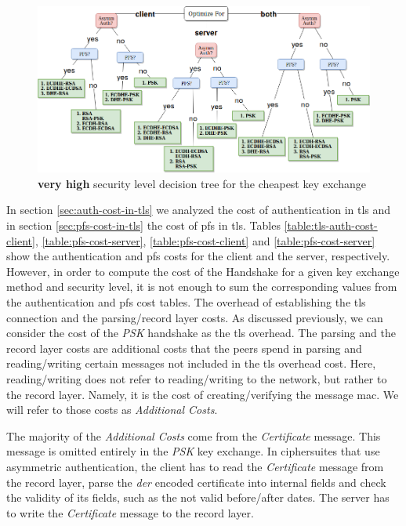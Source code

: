 \documentclass{llncs}
\begin{document}
\begin{figure}
  \centering
  \includegraphics[width=1.0\textwidth]{img/dt_veryhigh_sl.png}
  \centering \caption{\label{fig:dt-veryhigh-sl} \textbf{very high} security level decision tree for the cheapest key exchange}
\end{figure}

In section \ref{sec:auth-cost-in-tls} we analyzed the cost of authentication in \gls{tls} and in section \ref{sec:pfs-cost-in-tls}
the cost of \gls{pfs} in \gls{tls}. Tables \ref{table:tls-auth-cost-client}, \ref{table:pfs-cost-server},
\ref{table:pfs-cost-client} and \ref{table:pfs-cost-server} show the authentication and \gls{pfs} costs for the client and the server,
respectively. However, in order to compute the cost of the Handshake for a given key exchange method and security level, it
is not enough to sum the corresponding values from the authentication and \gls{pfs} cost tables. The overhead of establishing the \gls{tls} connection and
the parsing/record layer costs. As discussed previously, we can consider the cost of the \textit{PSK} handshake as the \gls{tls} overhead.
The parsing and the record layer costs are additional costs that the
peers spend in parsing and reading/writing certain messages not included in the \gls{tls} overhead cost.
Here, reading/writing does not refer to reading/writing to the network, but rather to the record layer. Namely, it is the cost of creating/verifying
the message \gls{mac}. We will refer to those costs as \textit{Additional Costs}.

The majority of the \textit{Additional Costs} come from the \textit{Certificate} message.
This message is omitted entirely in the \textit{PSK} key exchange. In ciphersuites that use asymmetric authentication,
the client has to read the  \textit{Certificate} message from the record layer, parse the \textit{der} encoded certificate into internal fields and
check the validity of its fields, such as the not valid before/after dates. The server has to write the \textit{Certificate} message to the
record layer.
\end{document}
